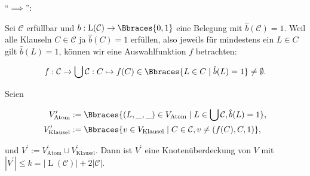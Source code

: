 \begin{solution}
\begin{example*}
\begin{center}
    \end{center}

\end{example*}

\enquote{$\implies$}:

Sei $\mathcal C$ erfüllbar und $b: \operatorname L(\mathcal C) \to \Bbraces{0, 1}$ eine Belegung mit $\hat b(\mathcal C) = 1$.
Weil alle Klauseln $C \in \mathcal C$ ja $\hat b(C) = 1$ erfüllen, also jeweils für mindestens ein $L \in C$ gilt $\hat b(L) = 1$, können wir eine Auswahlfunktion $f$ betrachten:

\begin{align*}
    f:
        \mathcal C \to \bigcup \mathcal C:
        C \mapsto f(C) \in \Bbraces{L \in C \mid \hat b(L) = 1} \neq \emptyset.
\end{align*}

Seien

\begin{align*}
    V_\text{Atom}^\prime
    & :=
    \Bbraces{(L, \_, \_) \in V_\text{Atom} \mid L \in \bigcup \mathcal C, \hat b(L) = 1}, \\
    V_\text{Klausel}^\prime
    & :=
    \Bbraces{v \in V_\text{Klausel} \mid C \in \mathcal C, v \neq (f(C), C, 1)},
\end{align*}

und $V^\prime := V_\text{Atom}^\prime \cup V_\text{Klausel}^\prime$.
Dann ist $V^\prime$ eine Knotenüberdeckung von $V$ mit $|V^\prime| \leq k = |\operatorname L(\mathcal C)| + 2 |\mathcal C|$.

\begin{enumerate}[label = \arabic*.]
    

\end{enumerate}
\end{solution}
